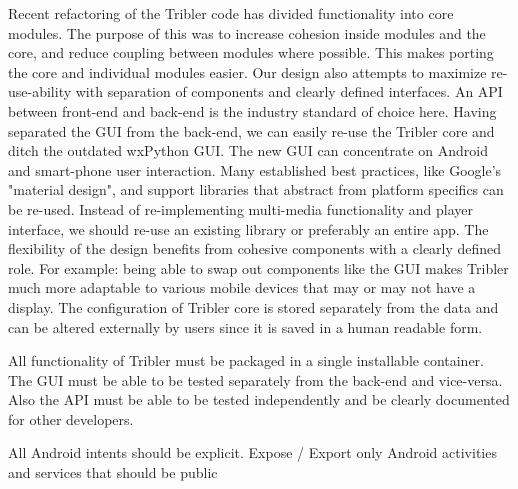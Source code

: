 Recent refactoring of the Tribler code has divided functionality into core modules.
The purpose of this was to increase cohesion inside modules and the core, and reduce coupling between modules where possible.
This makes porting the core and individual modules easier.
Our design also attempts to maximize re-use-ability with separation of components and clearly defined interfaces.
An API between front-end and back-end is the industry standard of choice here.
Having separated the GUI from the back-end, we can easily re-use the Tribler core and ditch the outdated wxPython GUI.
The new GUI can concentrate on Android and smart-phone user interaction.
Many established best practices, like Google's "material design", and support libraries that abstract from platform specifics can be re-used.
Instead of re-implementing multi-media functionality and player interface, we should re-use an existing library or preferably an entire app.
The flexibility of the design benefits from cohesive components with a clearly defined role.
For example: being able to swap out components like the GUI makes Tribler much more adaptable to various mobile devices that may or may not have a display.
The configuration of Tribler core is stored separately from the data and can be altered externally by users since it is saved in a human readable form.

All functionality of Tribler must be packaged in a single installable container.
The GUI must be able to be tested separately from the back-end and vice-versa.
Also the API must be able to be tested independently and be clearly documented for other developers.

All Android intents should be explicit. \cite{paper Analysing inter-application communication in Android}
Expose / Export only Android activities and services that should be public


